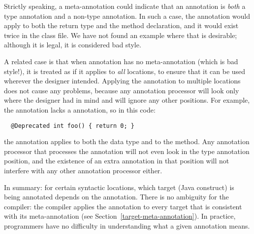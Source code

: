 \documentclass[10pt]{article}
\begin{document}
Strictly speaking, a  meta-annotation could indicate that an
annotation is \emph{both} a type annotation and a non-type annotation.  In
such a case, the annotation would apply to both the return type and the
method declaration, and it would exist twice in the class file.  We have
not found an example where that is desirable; although it is legal, it is
considered bad style.

A related case is that when annotation has no 
meta-annotation (which is bad style!), it is treated as if it applies to
\emph{all} locations, to ensure that it can be used wherever the designer
intended.  Applying the annotation to multiple locations does not cause any
problems, because any annotation processor will look only where the
designer had in mind and will ignore any other positions.  For example, the
 annotation lacks a  annotation, so in this
code:

\begin{Verbatim}
  @Deprecated int foo() { return 0; }
\end{Verbatim}

\noindent
the  annotation applies to both the  data type
and to the  method.  Any annotation processor that processes the
 annotation will not even look in the type annotation
position, and the existence of an extra annotation in that position will
not interfere with any other annotation processor either.


In summary:  for certain syntactic locations, which target (Java construct)
is being annotated depends on the annotation.
There is no ambiguity for the compiler:
the compiler applies the annotation to every
target that is consistent with its meta-annotation (see
Section~\ref{target-meta-annotation}).
In practice, programmers
have no difficulty in understanding what a given annotation means.










\end{document}
